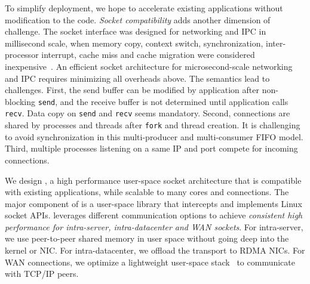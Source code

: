 

To simplify deployment, we hope to accelerate existing applications without modification to the code. \textit{Socket compatibility} adds another dimension of challenge. The socket interface was designed for networking and IPC in millisecond scale, when memory copy, context switch, synchronization, inter-processor interrupt, cache miss and cache migration were considered inexpensive~\cite{barroso2017attack}. An efficient socket architecture for microsecond-scale networking and IPC requires minimizing all overheads above. The semantics lead to challenges. First, the send buffer can be modified by application after non-blocking \texttt{send}, and the receive buffer is not determined until application calls \texttt{recv}. Data copy on \texttt{send} and \texttt{recv} seems mandatory. Second, connections are shared by processes and threads after \texttt{fork} and thread creation. It is challenging to avoid synchronization in this multi-producer and multi-consumer FIFO model. Third, multiple processes listening on a same IP and port compete for incoming connections.


We design \sys{}, a high performance user-space socket architecture that is compatible with existing applications, while scalable to many cores and connections. The major component of \sys{} is a user-space library \libipc{} that intercepts and implements Linux socket APIs. \libipc{} leverages different communication options to achieve \textit{consistent high performance for intra-server, intra-datacenter and WAN sockets}. For intra-server, we use peer-to-peer shared memory in user space without going deep into the kernel or NIC. For intra-datacenter, we offload the transport to RDMA NICs. For WAN connections, we optimize a lightweight user-space stack~\cite{dunkels2001design} to communicate with TCP/IP peers.

